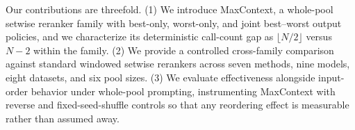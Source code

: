 Our contributions are threefold. (1) We introduce MaxContext, a whole-pool setwise reranker family with best-only, worst-only, and joint best--worst output policies, and we characterize its deterministic call-count gap as $\lfloor N/2 \rfloor$ versus $N{-}2$ within the family. (2) We provide a controlled cross-family comparison against standard windowed setwise rerankers across seven methods, nine models, eight datasets, and six pool sizes. (3) We evaluate effectiveness alongside input-order behavior under whole-pool prompting, instrumenting MaxContext with reverse and fixed-seed-shuffle controls so that any reordering effect is measurable rather than assumed away.
